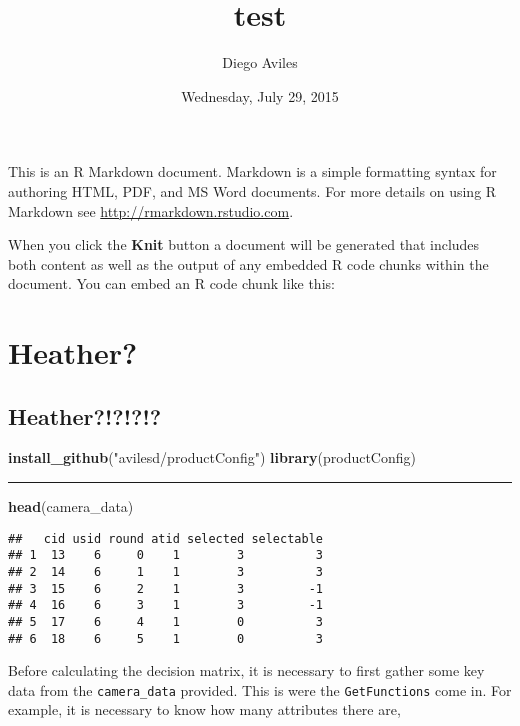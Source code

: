 \documentclass[]{article}
\title{test}
\author{Diego Aviles}
\date{Wednesday, July 29, 2015}
\newenvironment{Shaded}{\begin{snugshade}}{\end{snugshade}}
\newcommand{\KeywordTok}[1]{\textcolor[rgb]{0.13,0.29,0.53}{\textbf{{#1}}}}
\newcommand{\StringTok}[1]{\textcolor[rgb]{0.31,0.60,0.02}{{#1}}}
\newcommand{\NormalTok}[1]{{#1}}
\begin{document}
\maketitle


This is an R Markdown document. Markdown is a simple formatting syntax
for authoring HTML, PDF, and MS Word documents. For more details on
using R Markdown see \url{http://rmarkdown.rstudio.com}.

When you click the \textbf{Knit} button a document will be generated
that includes both content as well as the output of any embedded R code
chunks within the document. You can embed an R code chunk like this:

\section{Heather?}\label{heather}

\subsection{Heather?!?!?!?}\label{heather-1}

\begin{Shaded}
\begin{Highlighting}[]
\KeywordTok{install_github}\NormalTok{(}\StringTok{"avilesd/productConfig"}\NormalTok{)}
\KeywordTok{library}\NormalTok{(productConfig)}
\end{Highlighting}
\end{Shaded}

\begin{center}\rule{0.5\linewidth}{\linethickness}\end{center}

\begin{Shaded}
\begin{Highlighting}[]
\KeywordTok{head}\NormalTok{(camera_data)}
\end{Highlighting}
\end{Shaded}

\begin{verbatim}
##   cid usid round atid selected selectable
## 1  13    6     0    1        3          3
## 2  14    6     1    1        3          3
## 3  15    6     2    1        3         -1
## 4  16    6     3    1        3         -1
## 5  17    6     4    1        0          3
## 6  18    6     5    1        0          3
\end{verbatim}

Before calculating the decision matrix, it is necessary to first gather
some key data from the \texttt{camera\_data} provided. This is were the
\texttt{GetFunctions} come in. For example, it is necessary to know how
many attributes there are,
\end{document}
